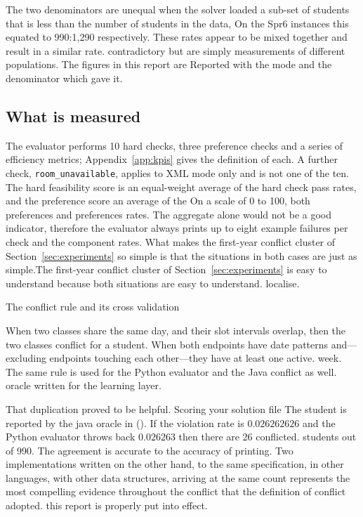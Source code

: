 The two denominators are unequal when the solver loaded a sub-set of students that is less than the number of students in the data,
On the Spr6 instances this equated to 990:1,290 respectively. These rates appear to be mixed together and result in a similar rate.
contradictory but are simply measurements of different populations. The figures in this report are
Reported with the mode and the denominator which gave it.

\subsection{What is measured}

The evaluator performs 10 hard checks, three preference checks and a series of efficiency metrics;
Appendix~\ref{app:kpis} gives the definition of each. A further check, \texttt{room\_unavailable},
applies to XML mode only and is not one of the ten. The hard feasibility score is an
equal-weight average of the hard check pass rates, and the preference score an average of the
On a scale of 0 to 100, both preferences and preferences rates. The aggregate alone would not be a good indicator, therefore the
evaluator always prints up to eight example failures per check and the component rates.
What makes the first-year conflict cluster of Section~\ref{sec:experiments} so simple is that the situations in both cases are just as simple.The first-year conflict cluster of Section~\ref{sec:experiments} is easy to understand because both situations are easy to understand.
localise.

The conflict rule and its cross validation

When two classes share the same day, and their slot intervals overlap, then the two classes conflict for a student.
When both endpoints have date patterns and---excluding endpoints touching each other---they have at least one active.
week. The same rule is used for the Python evaluator and the Java conflict as well.
oracle written for the learning layer.

That duplication proved to be helpful. Scoring your solution file
The student is reported by the java oracle in ().
If the violation rate is $0.026262626$ and the Python evaluator throws back $0.026263$ then there are 26 conflicted.
students out of 990. The agreement is accurate to the accuracy of printing. Two implementations written
on the other hand, to the same specification, in other languages, with other data structures, arriving at
the same count represents the most compelling evidence throughout the conflict that the definition of conflict adopted.
this report is properly put into effect.

